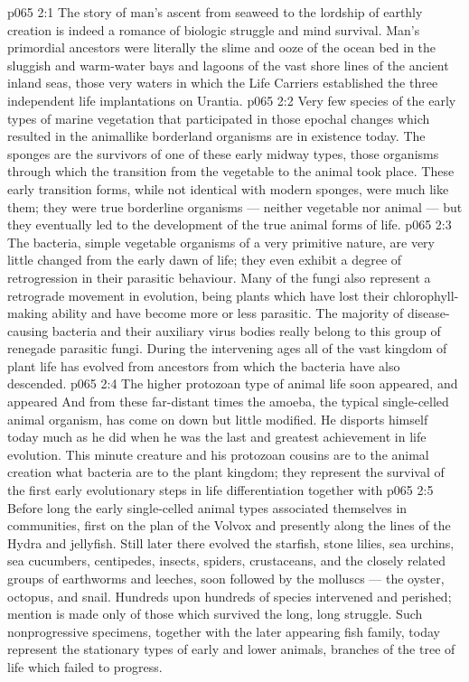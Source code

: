 \vs p065 2:1 The story of man’s ascent from seaweed to the lordship of earthly creation is indeed a romance of biologic struggle and mind survival. Man’s primordial ancestors were literally the slime and ooze of the ocean bed in the sluggish and warm\hyp{}water bays and lagoons of the vast shore lines of the ancient inland seas, those very waters in which the Life Carriers established the three independent life implantations on Urantia.
\vs p065 2:2 Very few species of the early types of marine vegetation that participated in those epochal changes which resulted in the animallike borderland organisms are in existence today. The sponges are the survivors of one of these early midway types, those organisms through which the  transition from the vegetable to the animal took place. These early transition forms, while not identical with modern sponges, were much like them; they were true borderline organisms --- neither vegetable nor animal --- but they eventually led to the development of the true animal forms of life.
\vs p065 2:3 The bacteria, simple vegetable organisms of a very primitive nature, are very little changed from the early dawn of life; they even exhibit a degree of retrogression in their parasitic behaviour. Many of the fungi also represent a retrograde movement in evolution, being plants which have lost their chlorophyll\hyp{}making ability and have become more or less parasitic. The majority of disease\hyp{}causing bacteria and their auxiliary virus bodies really belong to this group of renegade parasitic fungi. During the intervening ages all of the vast kingdom of plant life has evolved from ancestors from which the bacteria have also descended.
\vs p065 2:4 The higher protozoan type of animal life soon appeared, and appeared  And from these far\hyp{}distant times the amoeba, the typical single\hyp{}celled animal organism, has come on down but little modified. He disports himself today much as he did when he was the last and greatest achievement in life evolution. This minute creature and his protozoan cousins are to the animal creation what bacteria are to the plant kingdom; they represent the survival of the first early evolutionary steps in life differentiation together with 
\vs p065 2:5 Before long the early single\hyp{}celled animal types associated themselves in communities, first on the plan of the Volvox and presently along the lines of the Hydra and jellyfish. Still later there evolved the starfish, stone lilies, sea urchins, sea cucumbers, centipedes, insects, spiders, crustaceans, and the closely related groups of earthworms and leeches, soon followed by the molluscs --- the oyster, octopus, and snail. Hundreds upon hundreds of species intervened and perished; mention is made only of those which survived the long, long struggle. Such nonprogressive specimens, together with the later appearing fish family, today represent the stationary types of early and lower animals, branches of the tree of life which failed to progress.
